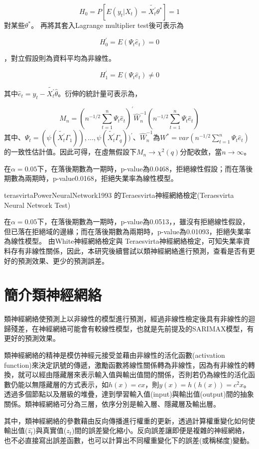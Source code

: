 \documentclass[oneside]{book}
\begin{document}
\[H_0=P[E(y_t|X_t)=\tilde{X^{'}_t}\theta^{*}]=1\]
對某些\(\theta^{*}\)。
再將其套入Lagrange multiplier test後可表示為

\[H_0^{'}=E(\Psi_t\hat{e}_t)=0\]

，對立假設則為資料平均為非線性。

\[H_1^{'}=E(\Psi_t\hat{e}_t)\neq0\]

其中\(\hat{e}_t=y_t-\tilde{X^{'}_t}\hat{\theta}\)。衍伸的統計量可表示為，

\[M_n=(n^{-1/2}\sum\limits^n_{t=1}\Psi_t\hat{e}_t)^{'}\hat{W}^{-1}_n(n^{-1/2}\sum\limits^n_{t=1}\Psi_t\hat{e}_t)\]
其中、\(\Psi_t=(\psi (\tilde{X^{'}_t}\Gamma_1)),...,\psi (\tilde{X^{'}_t}\Gamma_q))^{'}\)、\(\hat{W}^{-1}_n\)為\(W^{*}=var(n^{-1/2}\sum\limits^n_{t=1}\Psi_t\hat{e}_t)\)的一致性估計值。因此可得，在虛無假設下\(M_n \to \chi^2(q)\)分配收斂，當\(n \to \infty\)。

在\(\alpha=0.05\)下，在落後期數為一期時，p-value為0.0468，拒絕線性假設；而在落後期數為兩期時，p-value0.0168，拒絕失業率為線性模型。

terasvirtaPowerNeuralNetwork1993 的Teraesvirta神經網絡檢定(Teraesvirta Neural Network Test)

在\(\alpha=0.05\)下，在落後期數為一期時，p-value為0.0513，，雖沒有拒絕線性假設，但已落在拒絕域的邊緣；而在落後期數為兩期時，p-value為0.01093，拒絕失業率為線性模型。
由White神經網絡檢定與 Teraesvirta神經網絡檢定，可知失業率資料存有非線性關係，因此，本研究後續嘗試以類神經網絡進行預測，查看是否有更好的預測效果、更少的預測誤差。

\hypertarget{ux7c21ux4ecbux985eux795eux7d93ux7db2ux7d61}{%
\section{簡介類神經網絡}\label{ux7c21ux4ecbux985eux795eux7d93ux7db2ux7d61}}

類神經網絡使預測上以非線性的模型進行預測，經過非線性檢定後具有非線性的迴歸殘差，在神經網絡可能會有較線性模型，也就是先前提及的SARIMAX模型，有更好的預測效果。

類神經網絡的精神是模仿神經元接受並藉由非線性的活化函數(activation function)來決定訊號的傳遞，激勵函數將線性關係轉為非線性，因為有非線性的轉換，就可以經由隱藏層來表示輸入值與輸出值間的關係，否則若仍為線性的活化函數仍能以無隱藏層的方式表示，如\(h(x)=cx\)，則\(y(x)=h(h(x))=c^2x\)。透過多個節點以及層級的堆疊，達到學習輸入值(input)與輸出值(output)間的抽象關係。類神經網絡可分為三層，依序分別是輸入層、隱藏層及輸出層。

其中，類神經網絡的參數藉由反向傳播進行權重的更新，透過計算權重變化如何使輸出值(\(\hat{z_t}\))與真實值(\(z_t\))間的誤差變化縮小。反向誤差讓即便是複雜的神經網絡，也不必直接寫出誤差函數，也可以計算出不同權重變化下的誤差(或稱梯度)變動。
\end{document}
